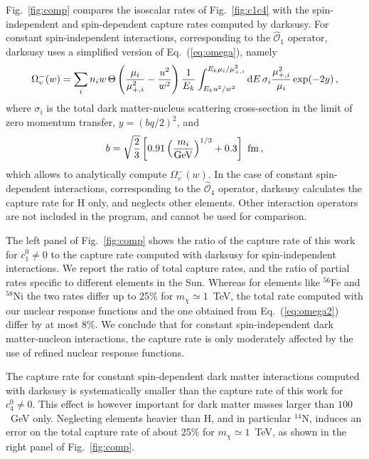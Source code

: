 \documentclass[11pt,a4paper]{article}
\begin{document}
Fig.~\ref{fig:comp} compares the isoscalar rates of Fig.~\ref{fig:c1c4} with the spin-independent and spin-dependent capture rates computed by {\sffamily darksusy}. For constant spin-independent interactions, corresponding to the $\hat{\mathcal{O}}_1$ operator, {\sffamily darksusy} uses a simplified version of Eq.~(\ref{eq:omega}), namely
\begin{equation}
\Omega_{v}^{-}(w)= \sum_i n_i w \,\Theta\left( \frac{\mu_i}{\mu^2_{+,i}} - \frac{u^2}{w^2} \right)\frac{1}{E_k}\int_{E_k u^2/w^2}^{E_k \mu_i/\mu_{+,i}^2} {\rm d}E\,\sigma_i\frac{\mu_{+,i}^2}{\mu_i} \exp(-2y)\,,
\label{eq:omega2}
\end{equation}
where $\sigma_i$ is the total dark matter-nucleus scattering cross-section in the limit of zero momentum transfer, $y=(bq/2)^2$, and 
\begin{equation}
b=\sqrt{\frac{2}{3}} \left[ 0.91 \left(\frac{m_i}{\rm GeV}\right)^{1/3} + 0.3 \right]~{\rm fm} \,,
\end{equation}
which allows to analytically compute $\Omega_{v}^{-}(w)$. In the case of constant spin-dependent interactions, corresponding to the $\hat{\mathcal{O}}_4$ operator, {\sffamily darksusy} calculates the capture rate for H only, and neglects other elements. 
Other interaction operators are not included in the program, and cannot be used for comparison.

The left panel of Fig.~\ref{fig:comp} shows the ratio of the capture rate of this work for $c_1^0\neq0$ to the capture rate computed with {\sffamily darksusy} for spin-independent interactions. We report the ratio of total capture rates, and the ratio of partial rates specific to different elements in the Sun. Whereas for elements like $^{56}$Fe and $^{58}$Ni the two rates differ up to 25\% for $m_\chi\simeq 1$~TeV, the total rate computed with our nuclear response functions and the one obtained from Eq.~(\ref{eq:omega2}) differ by at most 8\%. We conclude that for constant spin-independent dark matter-nucleon interactions, the capture rate is only moderately affected by the use of refined nuclear response functions. 

The capture rate for constant spin-dependent dark matter interactions computed with {\sffamily darksusy} is systematically smaller than the capture rate of this work for $c_4^0\neq0$. This effect is however important for dark matter masses larger than $100$~GeV only. Neglecting elements heavier than H, and in particular $^{14}$N, induces an error on the total capture rate of about 25\% for $m_\chi\simeq 1$~TeV, as shown in the right panel of Fig.~\ref{fig:comp}. 
\end{document}
